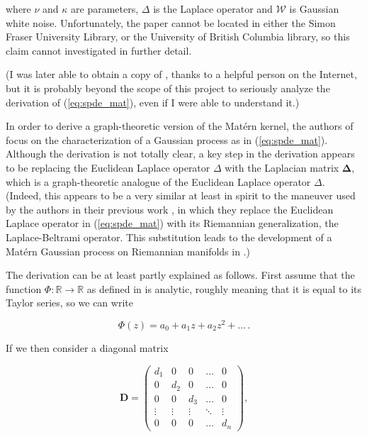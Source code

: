 where $\nu$ and $\kappa$ are parameters, $\Delta$ is the Laplace operator and $\mathcal W$ is Gaussian white noise. Unfortunately, the paper \cite{whittle1963stochastic} cannot be located in either the Simon Fraser University Library, or the University of British Columbia library, so this claim cannot investigated in further detail.

(I was later able to obtain a copy of \cite{whittle1963stochastic}, thanks to a helpful person on the Internet, but it is probably beyond the scope of this project to seriously analyze the derivation of (\ref{eq:spde_mat}), even if I were able to understand it.)

In order to derive a graph-theoretic version of the Mat\'{e}rn kernel, the authors of \cite{pmlr-v130-borovitskiy21a} focus on the characterization of a Gaussian process as in (\ref{eq:spde_mat}). Although the derivation is not totally clear, a key step in the derivation appears to be replacing the Euclidean Laplace operator $\Delta$ with the Laplacian matrix $\bm \Delta$, which is a graph-theoretic analogue of the Euclidean Laplace operator $\Delta$. (Indeed, this appears to be a very similar at least in spirit to the maneuver used by the authors in their previous work \cite{NEURIPS2020_92bf5e62}, in which they replace the Euclidean Laplace operator in (\ref{eq:spde_mat}) with its Riemannian generalization, the Laplace-Beltrami operator. This substitution leads to the development of a Mat\'{e}rn Gaussian process on Riemannian manifolds in \cite{NEURIPS2020_92bf5e62}.)

The derivation can be at least partly explained as follows. First assume that the function $\Phi \colon \mathbb R \to \mathbb R$ as defined in \cite{pmlr-v130-borovitskiy21a} is analytic, roughly meaning that it is equal to its Taylor series, so we can write

\begin{equation}\label{eq:phi_1}
    \Phi(z) = a_0 + a_1 z + a_2 z^2 + \dots \, .
\end{equation}

If we then consider a diagonal matrix

\[
    \mathbf D = 
    \begin{pmatrix}
        d_1 & 0 & 0 & \ldots & 0 \\
        0 & d_2 & 0 & \ldots & 0 \\
        0 & 0 & d_3 & \ldots & 0 \\
        \vdots & \vdots & \vdots & \ddots & \vdots \\
        0 & 0 & 0 & \ldots & d_n
    \end{pmatrix},
\]

